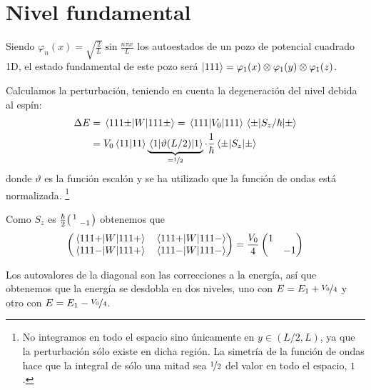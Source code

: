 \section*{Nivel fundamental}
Siendo $\varphi_n(x) = \sqrt{\frac{2}{L}}\sin \frac{n\pi x}{L}$ los
autoestados de un pozo de potencial cuadrado 1D, el estado fundamental
de este pozo será $\ket{111}=\varphi_1(x)\otimes\varphi_1(y)\otimes\varphi_1(z)$.

Calculamos la perturbación, teniendo en cuenta la degeneración del
nivel debida al espín:
\begin{equation}
  \begin{split}
    \Delta E &= \mel{111\pm}{W}{111\pm} =
    \mel{111}{V_0}{111}\mel{\pm}{S_z/\hbar}{\pm} \\
    &= V_0\braket{11}{11}\underbrace{\mel{1}{\vartheta(L/2)}{1}}_{=\nicefrac{1}{2} } \cdot \frac{1}{\hbar}
    \mel{\pm}{S_z}{\pm}
  \end{split}
\end{equation}
donde $\vartheta$ es la función escalón y se ha utilizado que la función de ondas está normalizada.
\footnote{No integramos en todo el espacio sino únicamente en
  $y\in(L/2,L)$, ya que la perturbación sólo existe en dicha región.
  La simetría de la función de ondas hace que la integral de sólo una
  mitad sea ${\nicefrac{1}{2}}$ del valor en todo el espacio, $1$.}

Como $S_z$ es $\frac{\hbar}{2}\smqty(1& \\ &-1)$ obtenemos que
\begin{equation}
  \begin{pmatrix}
    \mel{111+}{W}{111+} &  \mel{111+}{W}{111-}\\
    \mel{111-}{W}{111+} &  \mel{111-}{W}{111-}
  \end{pmatrix} =  \frac{V_0}{4}
  \begin{pmatrix}
    1 &  \\
     & -1 
  \end{pmatrix} 
\end{equation}

Los autovalores de la diagonal son las correcciones a la energía, así
que obtenemos que la energía se desdobla en dos niveles, uno con
$E=E_1+\nicefrac{V_0}{4}$ y otro con $E=E_1-\nicefrac{V_0}{4}$.

